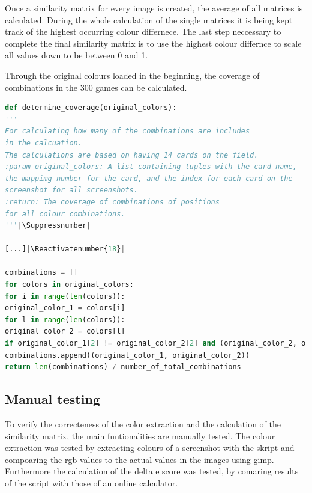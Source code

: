 %	
Once a similarity matrix for every image is created, the average of all matrices is calculated. During the whole calculation of the single matrices it is being kept track of the highest occurring colour differnece. The last step neccessary to complete the final similarity matrix is to use the highest colour differnce to scale all values down to be between 0 and 1. 

Through the original colours loaded in the beginning, the coverage of combinations in the 300 games can be calculated. 
\begin{lstlisting}[language=python, caption=Add caption]
def determine_coverage(original_colors):
'''
For calculating how many of the combinations are includes 
in the calcuation. 
The calculations are based on having 14 cards on the field.
:param original_colors: A list containing tuples with the card name, 
the mappimg number for the card, and the index for each card on the 
screenshot for all screenshots.
:return: The coverage of combinations of positions 
for all colour combinations. 
'''|\Suppressnumber|

[...]|\Reactivatenumber{18}|

combinations = []
for colors in original_colors:
for i in range(len(colors)):
original_color_1 = colors[i]
for l in range(len(colors)):
original_color_2 = colors[l]
if original_color_1[2] != original_color_2[2] and (original_color_2, original_color_1) not in combinations and (original_color_1, original_color_2) not in combinations:
combinations.append((original_color_1, original_color_2))    
return len(combinations) / number_of_total_combinations
\end{lstlisting}

\subsection{Manual testing}
To verify the correcteness of the color extraction and the calculation of the similarity matrix, the main funtionalities are manually tested. The colour extraction was tested by extracting colours of a screenshot with the skript and compoaring the rgb values to the actual values in the images using gimp. Furthermore the calculation of the delta e score was tested, by comaring results of the script with those of an online calculator.  

